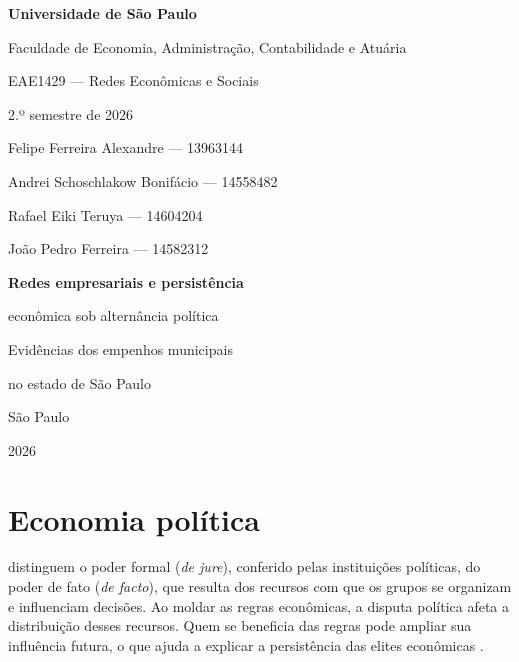 \documentclass[10pt,a4paper]{article}
\begin{document}
\hypersetup{pageanchor=false}
\begin{titlepage}
\centering
\vspace*{1cm}
{\Large\bfseries Universidade de São Paulo\par}
\vspace{0.4ex}
{\large Faculdade de Economia, Administração, Contabilidade e Atuária\par}
\vspace{1.2ex}
{\normalsize EAE1429 --- Redes Econômicas e Sociais\par
2.º semestre de 2026\par}
\avisoAmostra\par

\vspace{2.6cm}
{\large{}
Felipe Ferreira Alexandre --- 13963144\par
Andrei Schoschlakow Bonifácio --- 14558482\par
Rafael Eiki Teruya --- 14604204\par
João Pedro Ferreira --- 14582312\par}

{\huge\bfseries
Redes empresariais e persistência\par
econômica sob alternância política\par}
\vspace{1.15ex}
{\Large Evidências dos empenhos municipais\par
no estado de São Paulo\par}

{\large São Paulo\par 2026\par}
\vspace*{0.9cm}
\end{titlepage}
\hypersetup{pageanchor=true}

\section{Economia política}
 distinguem o poder formal (\textit{de jure}), conferido pelas
instituições políticas, do poder de fato (\textit{de facto}), que resulta dos recursos com que
os grupos se organizam e influenciam decisões. Ao moldar as regras econômicas, a disputa política
afeta a distribuição desses recursos. Quem se beneficia das regras pode ampliar sua influência
futura, o que ajuda a explicar a persistência das elites econômicas \cite{acemoglu2008}.
\end{document}
